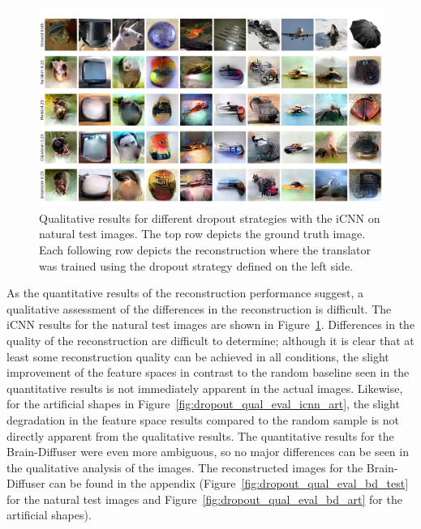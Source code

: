 \begin{figure}[ht]
  \centering
  \includegraphics[width=1\textwidth]{plots/dropout_qual_eval_icnn_test.JPEG}
  \caption[Experiment 1: Reconstructed images for iCNN on natural test images]{Qualitative results for different dropout strategies with the iCNN on natural test images. The top row depicts the ground truth image. Each following row depicts the reconstruction where the translator was trained using the dropout strategy defined on the left side.}\label{fig:dropout_qual_eval_icnn_test}
\end{figure}

As the quantitative results of the reconstruction performance suggest, a qualitative assessment of the differences in the reconstruction is difficult. The iCNN results for the natural test images are shown in Figure~\ref{fig:dropout_qual_eval_icnn_test}. Differences in the quality of the reconstruction are difficult to determine; although it is clear that at least some reconstruction quality can be achieved in all conditions, the slight improvement of the feature spaces in contrast to the random baseline  seen in the quantitative results is not immediately apparent in the actual images. Likewise, for the artificial shapes in Figure~\ref{fig:dropout_qual_eval_icnn_art}, the slight degradation in the feature space results compared to the random sample is not directly apparent from the qualitative results. The quantitative results for the Brain-Diffuser were even more ambiguous, so no major differences can be seen in the qualitative analysis of the images. The reconstructed images for the Brain-Diffuser can be found in the appendix (Figure~\ref{fig:dropout_qual_eval_bd_test} for the natural test images and Figure~\ref{fig:dropout_qual_eval_bd_art} for the artificial shapes).


